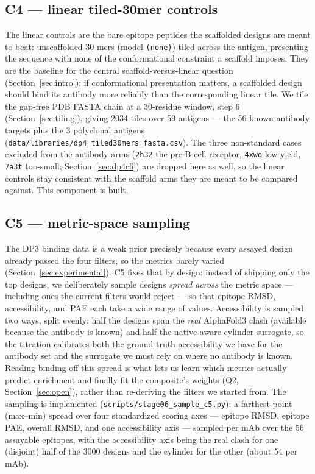 \subsection{C4 --- linear tiled-30mer controls}\label{sec:dp4c4}
The linear controls are the bare epitope peptides the scaffolded designs are meant to beat:
unscaffolded 30-mers (model \texttt{(none)}) tiled across the antigen, presenting the sequence
with none of the conformational constraint a scaffold imposes. They are the baseline for the
central scaffold-versus-linear question (Section~\ref{sec:intro}): if conformational presentation
matters, a scaffolded design should bind its antibody more reliably than the corresponding linear
tile. We tile the gap-free PDB FASTA chain at a 30-residue window, step 6
(Section~\ref{sec:tiling}), giving \num{2034} tiles over \num{59} antigens --- the \num{56}
known-antibody targets plus the \num{3} polyclonal antigens
(\texttt{data/libraries/dp4\_tiled30mers\_fasta.csv}). The three non-standard cases excluded from the
antibody arms (\texttt{2h32} the pre-B-cell receptor, \texttt{4xwo} low-yield, \texttt{7a3t} too-small;
Section~\ref{sec:dp4c6}) are dropped here as well, so the linear controls stay consistent with the
scaffold arms they are meant to be compared against. This component is built.

\subsection{C5 --- metric-space sampling}\label{sec:dp4c5}
The DP3 binding data is a weak prior precisely because every assayed design already passed the
four filters, so the metrics barely varied (Section~\ref{sec:experimental}). C5 fixes that by
design: instead of shipping only the top designs, we deliberately sample designs \emph{spread
across} the metric space --- including ones the current filters would reject --- so that epitope
RMSD, accessibility, and PAE each take a wide range of values. Accessibility is sampled two ways, split evenly: half the designs span the \emph{real} AlphaFold3
clash (available because the antibody is known) and half the native-aware cylinder surrogate, so the
titration calibrates both the ground-truth accessibility we have for the antibody set and the surrogate
we must rely on where no antibody is known. Reading binding off this spread is what lets us learn which
metrics actually predict enrichment and finally fit the composite's weights (Q2,
Section~\ref{sec:open}), rather than re-deriving the filters we started from. The sampling is implemented
(\texttt{scripts/stage06\_sample\_c5.py}): a farthest-point (max--min) spread over four standardized
scoring axes --- epitope RMSD, epitope PAE, overall RMSD, and one accessibility axis --- sampled per mAb
over the \num{56} assayable epitopes, with the accessibility axis being the real clash for one
(disjoint) half of the \num{3000} designs and the cylinder for the other (about \num{54} per mAb).

